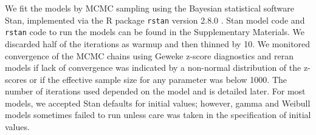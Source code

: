 \documentclass[12pt]{article}
\newcommand{\vX}{\textbf{X}}
\newcommand{\vZ}{\textbf{Z}}
\newcommand{\vbeta}{\boldsymbol{\beta}}
\newcommand{\vxi}{\boldsymbol{\xi}}
\begin{document}
We fit the models by MCMC sampling using the Bayesian statistical software Stan, implemented via the R package \texttt{rstan} version 2.8.0 \citep{Rstan2015}.  
Stan model code and \texttt{rstan} code to run the models can be found in the Supplementary Materials.  
We discarded half of the iterations as warmup and then thinned by 10.  
We monitored convergence of the MCMC chains using Geweke z-score diagnostics \citep{Geweke1991} and reran models if lack of convergence was indicated by a non-normal distribution of the z-scores or if the effective sample size for any parameter was below 1000.  
The number of iterations used depended on the model and is detailed later. 
For most models, we accepted Stan defaults for initial values; however, gamma and Weibull models sometimes failed to run unless care was taken in the specification of initial values.








\end{document}
